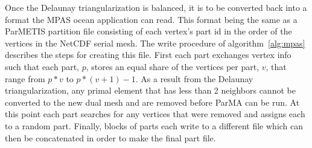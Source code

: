 \documentclass[a4paper]{article}
\begin{document}
Once the Delaunay triangularization is balanced, it is to be converted back into
a format the MPAS ocean application can read.
This format being the same as a ParMETIS partition file consisting of each
vertex's part id in the order of the vertices in the NetCDF serial mesh.
The write procedure of algorithm~\ref{alg:mpas} describes the steps for creating
this file.
First each part exchanges vertex info such that each part, $p$, stores an equal
share of the vertices per part, $v$, that range from $p*v$ to $p*(v+1)-1$.
As a result from the Delaunay triangularization, any primal element that has
less than 2 neighbors cannot be converted to the new dual mesh and are removed
before ParMA can be run.
At this point each part searches for any vertices that were removed and assigns
each to a random part.
Finally, blocks of parts each write to a different file which can then be
concatenated in order to make the final part file.
\end{document}
